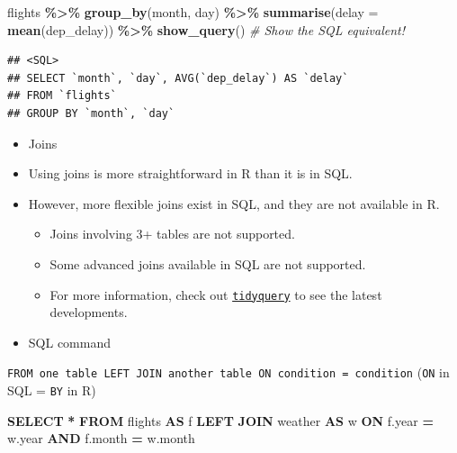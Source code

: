 \documentclass[
]{book}
\newenvironment{Shaded}{\begin{snugshade}}{\end{snugshade}}
\newcommand{\AttributeTok}[1]{\textcolor[rgb]{0.13,0.29,0.53}{#1}}
\newcommand{\CommentTok}[1]{\textcolor[rgb]{0.56,0.35,0.01}{\textit{#1}}}
\newcommand{\DataTypeTok}[1]{\textcolor[rgb]{0.13,0.29,0.53}{#1}}
\newcommand{\FunctionTok}[1]{\textcolor[rgb]{0.13,0.29,0.53}{\textbf{#1}}}
\newcommand{\KeywordTok}[1]{\textcolor[rgb]{0.13,0.29,0.53}{\textbf{#1}}}
\newcommand{\NormalTok}[1]{#1}
\newcommand{\OperatorTok}[1]{\textcolor[rgb]{0.81,0.36,0.00}{\textbf{#1}}}
\newcommand{\SpecialCharTok}[1]{\textcolor[rgb]{0.81,0.36,0.00}{\textbf{#1}}}
\providecommand{\tightlist}{%
  \setlength{\itemsep}{0pt}\setlength{\parskip}{0pt}}
\begin{document}
\begin{Shaded}
\begin{Highlighting}[]
\NormalTok{flights }\SpecialCharTok{\%\textgreater{}\%}
  \FunctionTok{group\_by}\NormalTok{(month, day) }\SpecialCharTok{\%\textgreater{}\%}
  \FunctionTok{summarise}\NormalTok{(}\AttributeTok{delay =} \FunctionTok{mean}\NormalTok{(dep\_delay)) }\SpecialCharTok{\%\textgreater{}\%}
  \FunctionTok{show\_query}\NormalTok{() }\CommentTok{\# Show the SQL equivalent!}
\end{Highlighting}
\end{Shaded}

\begin{verbatim}
## <SQL>
## SELECT `month`, `day`, AVG(`dep_delay`) AS `delay`
## FROM `flights`
## GROUP BY `month`, `day`
\end{verbatim}

\begin{itemize}
\item
  Joins
\item
  Using joins is more straightforward in R than it is in SQL.
\item
  However, more flexible joins exist in SQL, and they are not available in R.

  \begin{itemize}
  \tightlist
  \item
    Joins involving 3+ tables are not supported.
  \item
    Some advanced joins available in SQL are not supported.
  \item
    For more information, check out \href{https://github.com/ianmcook/tidyquery/issues}{\texttt{tidyquery}} to see the latest developments.
  \end{itemize}
\item
  SQL command
\end{itemize}

\texttt{FROM\ one\ table\ LEFT\ JOIN\ another\ table\ ON\ condition\ =\ condition} (\texttt{ON} in SQL = \texttt{BY} in R)

\begin{Shaded}
\begin{Highlighting}[]
\KeywordTok{SELECT} \OperatorTok{*}
\KeywordTok{FROM}\NormalTok{ flights }\KeywordTok{AS}\NormalTok{ f}
\KeywordTok{LEFT} \KeywordTok{JOIN}\NormalTok{ weather }\KeywordTok{AS}\NormalTok{ w }
\KeywordTok{ON}\NormalTok{ f.}\DataTypeTok{year} \OperatorTok{=}\NormalTok{ w.}\DataTypeTok{year} \KeywordTok{AND}\NormalTok{ f.}\DataTypeTok{month} \OperatorTok{=}\NormalTok{ w.}\DataTypeTok{month}
\end{Highlighting}
\end{Shaded}
\end{document}
